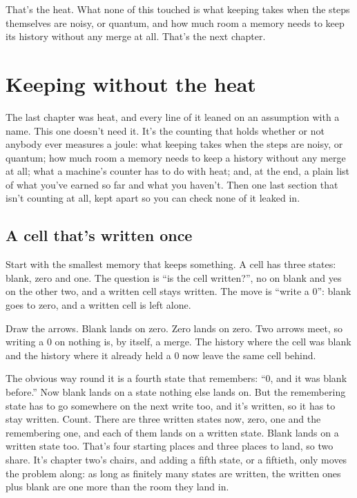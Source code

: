 \documentclass[11pt,twoside]{article}
\theoremstyle{thielethm}
\theoremstyle{thieledef}
\theoremstyle{thieledef}
\theoremstyle{thieledef}
\theoremstyle{thielethm}
\theoremstyle{thieleobs}
\theoremstyle{thielethm}
\begin{document}
That's the heat. What none of this touched is what keeping takes when the steps themselves are noisy, or quantum, and how much room a memory needs to keep its history without any merge at all. That's the next chapter.

\section{Keeping without the heat}
\label{sec:keeping}

The last chapter was heat, and every line of it leaned on an assumption with a name. This one doesn't need it. It's the counting that holds whether or not anybody ever measures a joule: what keeping takes when the steps are noisy, or quantum; how much room a memory needs to keep a history without any merge at all; what a machine's counter has to do with heat; and, at the end, a plain list of what you've earned so far and what you haven't. Then one last section that isn't counting at all, kept apart so you can check none of it leaked in.

\subsection{A cell that's written once}

Start with the smallest memory that keeps something. A cell has three states: blank, zero and one. The question is ``is the cell written?'', no on blank and yes on the other two, and a written cell stays written. The move is ``write a 0'': blank goes to zero, and a written cell is left alone.

Draw the arrows. Blank lands on zero. Zero lands on zero. Two arrows meet, so writing a 0 on nothing is, by itself, a merge. The history where the cell was blank and the history where it already held a 0 now leave the same cell behind.

The obvious way round it is a fourth state that remembers: ``0, and it was blank before.'' Now blank lands on a state nothing else lands on. But the remembering state has to go somewhere on the next write too, and it's written, so it has to stay written. Count. There are three written states now, zero, one and the remembering one, and each of them lands on a written state. Blank lands on a written state too. That's four starting places and three places to land, so two share. It's chapter two's chairs, and adding a fifth state, or a fiftieth, only moves the problem along: as long as finitely many states are written, the written ones plus blank are one more than the room they land in.
\end{document}
